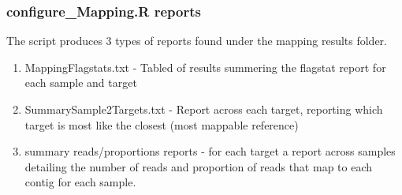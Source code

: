 \documentclass[pdf]{beamer}
\begin{document}

\begin{frame}
\frametitle{configure\_Mapping.R reports}
The script produces 3 types of reports found under the mapping results folder.\\
\begin{enumerate}
\item MappingFlagstats.txt - Tabled of results summering the flagstat report for each sample and target
\item SummarySample2Targets.txt - Report across each target, reporting which target is most like the closest (most mappable reference)
\item summary reads/proportions reports - for each target a report across samples detailing the number of reads and proportion of reads that map to each contig for each sample.
\end{enumerate}

\end{frame}
\end{document}
